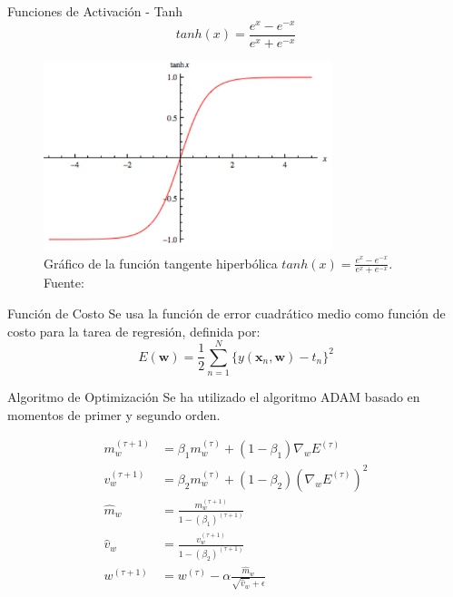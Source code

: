 \documentclass[10pt]{beamer}
\begin{document}
\begin{frame}{Funciones de Activación - Tanh}
    \begin{equation}\label{eq:tanh}
        tanh(x) = \frac{e^x - e^{-x}}{e^x + e^{-x}}
    \end{equation}

    \begin{figure}[!h] 
        \centering
        \includegraphics[width=0.75\textwidth]{../img/tanh}
        \caption[Gráfico de la función tangente hiperbólica]{Gráfico de la función tangente hiperbólica $tanh(x) = \frac{e^x - e^{-x}}{e^x + e^{-x}}$. Fuente: \cite{wang_2016} }
                \end{figure}
\end{frame}

\begin{frame}{Función de Costo}
    Se usa la función de \alert{error cuadrático medio} como función de costo 
    para la tarea de regresión, definida por:
    \begin{equation}\label{eq:error}
        E(\mathbf{w}) = \frac{1}{2} \sum_{n=1}^N \{y(\mathbf{x}_n, \mathbf{w}) - t_n\}^2
    \end{equation}
\end{frame}


\begin{frame}{Algoritmo de Optimización}
    Se ha utilizado el algoritmo \alert{ADAM} basado en momentos de primer y segundo orden.

    \begin{align}
        m_w^{(\tau + 1)} &= \beta_1 m_w^{(\tau)} + (1 - \beta_1) \nabla_w E^{(\tau)} \nonumber \\
        v_w^{(\tau + 1)} &= \beta_2 m_w^{(\tau)} + (1 - \beta_2) (\nabla_w E^{(\tau)})^2 \nonumber \\
        \hat{m}_w &= \frac{m_w^{(\tau + 1)}}{1 - (\beta_1)^{(\tau + 1)} } \nonumber \\
        \hat{v}_w &= \frac{v_w^{(\tau + 1)}}{1 - (\beta_2)^{(\tau + 1)} } \nonumber \\
        w^{(\tau + 1)} &= w^{(\tau)} - \alpha \frac{\hat{m}_w}{\sqrt{\hat{v}_w} + \epsilon} \label{eq:adam}
    \end{align}

\end{frame}
\end{document}

